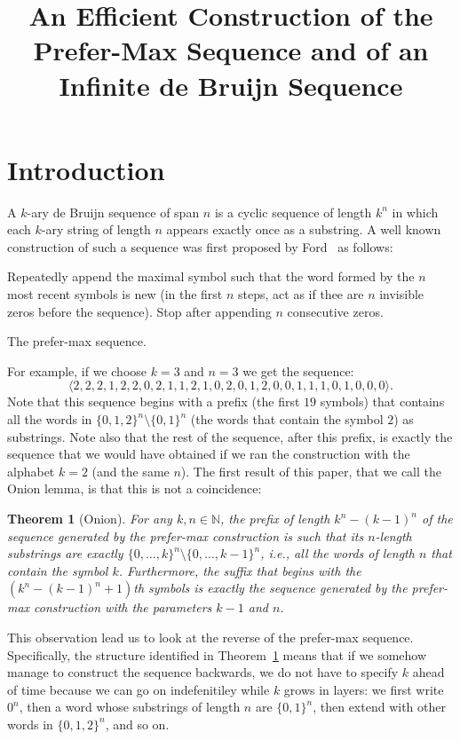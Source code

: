\documentclass{article}
\title{An Efficient Construction of the Prefer-Max Sequence and of an Infinite de Bruijn Sequence}
\author{}
\newtheorem{theorem}{Theorem}
\theoremstyle{definition}
\newcommand{\N}{{\mathbb{N}}}
\begin{document}
\maketitle

\section{Introduction}

A $k$-ary de Bruijn sequence of span $n$ is a cyclic sequence of length $k^n$ in which each $k$-ary string of length $n$ appears exactly once as
a substring. A well known construction of such a sequence was first proposed by Ford~\cite{Ford1957} as follows:

\begin{algorithm}
Repeatedly append the maximal symbol such that the word formed by the $n$ most recent symbols is new (in the first $n$ steps, act as if thee are $n$ invisible zeros before the sequence). Stop after appending $n$ consecutive zeros. 
\caption{The prefer-max sequence.}
\end{algorithm}


For example, if we choose $k=3$ and $n=3$ we get the sequence:
$$\langle2,2,2,1,2,2,0,2,1,1,2,1,0,2,0,1,2,0,0,1,1,1,0,1,0,0,0\rangle.$$
Note that this sequence begins with a prefix (the first $19$ symbols) that contains all the words in $\{0,1,2\}^n \setminus \{0,1\}^n$  (the words that contain the symbol $2$) as substrings. Note also that the rest of the sequence, after this prefix, is exactly the sequence that we would have obtained if we ran the construction with the alphabet $k=2$ (and the same $n$). The first result of this paper, that we call the Onion lemma, is that this is not a coincidence:

\begin{theorem}[Onion]
	For any $k,n \in \N$, the prefix of length $k^n-(k-1)^n$ of the sequence generated by the prefer-max construction is such that its $n$-length substrings are exactly $\{0,\dots,k\}^n \setminus \{0,\dots,k-1\}^n$, i.e., all the words of length $n$ that contain the symbol $k$. Furthermore, the suffix that begins with the 
	$(k^n-(k-1)^n+1)$th symbols is exactly the sequence generated by the prefer-max construction with the parameters $k-1$ and $n$.
	\label{thm:onion}
\end{theorem}

This observation lead us to look at the reverse of the prefer-max sequence. Specifically, the structure identified in Theorem~\ref{thm:onion} means that if we somehow manage to construct the sequence backwards, we do not have to specify $k$ ahead of time because we can go on indefenitiley while $k$ grows in layers: we first write $0^n$, then a word whose substrings of length $n$ are $\{0,1\}^n$, then extend with other words in $\{0,1,2\}^n$, and so on.
\end{document}
